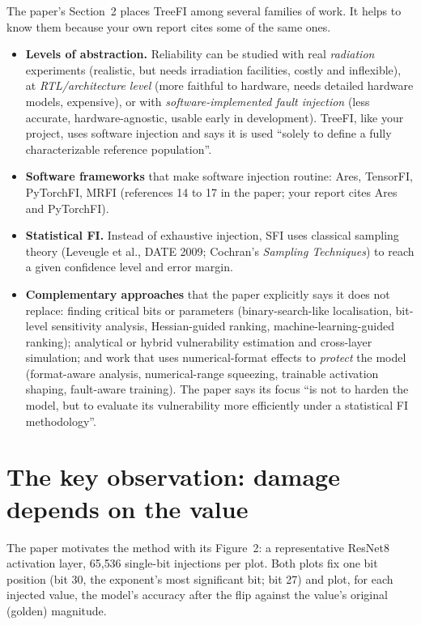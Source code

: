 The paper's Section~2 places TreeFI among several families of work. It helps to know them because your own report cites some of the same ones.
\begin{itemize}
\item \textbf{Levels of abstraction.} Reliability can be studied with real \emph{radiation} experiments (realistic, but needs irradiation facilities, costly and inflexible),
 at \emph{RTL/architecture level} (more faithful to hardware, needs detailed hardware models, expensive), or with \emph{software-implemented fault injection} (less accurate, hardware-agnostic,
 usable early in development). TreeFI, like your project, uses software injection and says it is used ``solely to define a fully characterizable reference population''.
\item \textbf{Software frameworks} that make software injection routine: Ares, TensorFI, PyTorchFI, MRFI (references 14 to 17 in the paper; your report cites Ares and PyTorchFI).
\item \textbf{Statistical FI.} Instead of exhaustive injection, SFI uses classical sampling theory (Leveugle et al., DATE 2009; Cochran's \emph{Sampling Techniques}) to reach a given confidence level and error margin.
\item \textbf{Complementary approaches} that the paper explicitly says it does not replace: finding critical bits or parameters (binary-search-like localisation, bit-level sensitivity analysis, Hessian-guided
 ranking, machine-learning-guided ranking); analytical or hybrid vulnerability estimation and cross-layer simulation; and work that uses numerical-format effects to \emph{protect} the model (format-aware analysis, numerical-range squeezing,
 trainable activation shaping, fault-aware training). The paper says its focus ``is not to harden the model, but to evaluate its vulnerability more efficiently under a statistical FI methodology''.
\end{itemize}

\section{The key observation: damage depends on the value}

The paper motivates the method with its Figure~2: a representative ResNet8 activation layer, 65{,}536 single-bit injections per plot. Both plots fix one bit position
(bit 30, the exponent's most significant bit; bit 27) and plot, for each injected value, the model's accuracy after the flip against the value's original (golden) magnitude.


